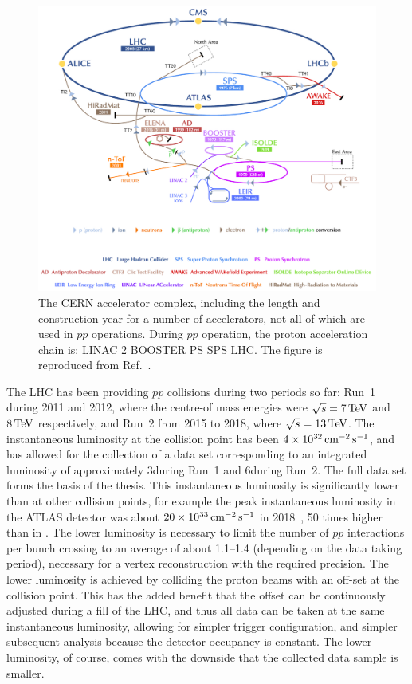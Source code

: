 \begin{figure}[tb]
    \centering
    \includegraphics[width=0.9\columnwidth]{figures/detector/CERN_complex.png}
    \caption{The CERN accelerator complex, including the length and construction year for a number of accelerators, not all of which are used in $pp$ operations. During $pp$ operation, the proton acceleration chain is: LINAC 2 \to BOOSTER \to PS \to SPS \to LHC.  The figure is reproduced from Ref.~\cite{CERNcomplex}.}
    \label{fig:CERN_accerators}
\end{figure}

The LHC has been providing $pp$ collisions during two periods so far: Run~1 during 2011 and 2012, where the centre-of mass energies were $\sqrt{s}=7\text{\,Te\kern -0.1em V}$ and $8\text{\,Te\kern -0.1em V}$ respectively, and Run~2 from 2015 to 2018, where $\sqrt{s}=13\text{\,Te\kern -0.1em V}$. The instantaneous luminosity at the \lhcb collision point has been $4\times 10^{32} \text{\,cm}^{-2} \,\mathrm s^{-1}$, and has allowed for the collection of a data set corresponding to an integrated luminosity of approximately 3\invfb during Run~1 and 6\invfb during Run~2. The full data set forms the basis of the thesis. This instantaneous luminosity is significantly lower than at other collision points, for example the peak instantaneous luminosity in the ATLAS detector was about $20\times 10^{33}\text{\,cm}^{-2}\,\mathrm s^{-1}$ in 2018~\cite{ATLAS-CONF-2019-021},  50 times higher than in \lhcb. The lower luminosity is necessary to limit the number of $pp$ interactions per bunch crossing to an average of about 1.1--1.4 (depending on the data taking period), necessary for a vertex reconstruction with the required precision. The lower luminosity is achieved by colliding the proton beams with an off-set at the \lhcb collision point. This has the added benefit that the offset can be continuously adjusted during a fill of the LHC, and thus all data can be taken at the same instantaneous luminosity, allowing for simpler trigger configuration, and simpler subsequent analysis because the detector occupancy is constant. The lower luminosity, of course, comes with the downside that the collected data sample is smaller.

